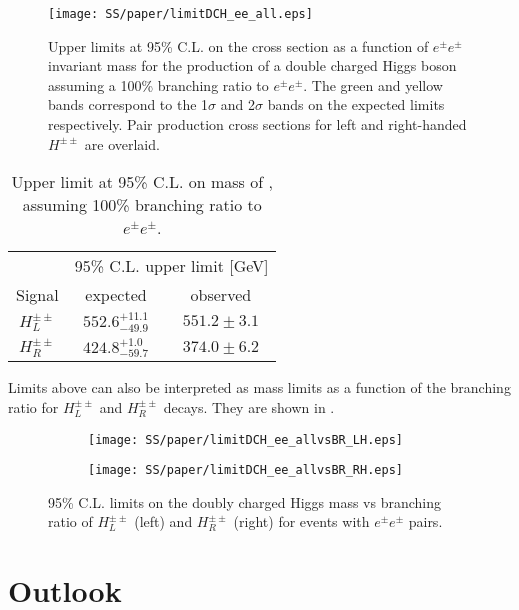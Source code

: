 \begin{figure}[h]
\begin{center}
\texttt{[image: SS/paper/limitDCH\_ee\_all.eps]}
\caption{Upper limits at 95\% C.L. on the cross section as a function of $e^{\pm}e^{\pm}$ invariant mass for the production of a double charged Higgs boson 
assuming a 100\% branching ratio to $e^{\pm}e^{\pm}$. The green and yellow bands correspond to the 1$\sigma$ and 2$\sigma$ bands on the expected limits respectively.
Pair production cross sections for left and right-handed $H^{\pm\pm}$ are overlaid.}
\label{fig:dch_limits_mass}
\end{center}
\end{figure}

\begin{table}[htbp]
\begin{center}
\begin{tabular}{c||c|c}
& \multicolumn{2}{c}{95\%  C.L. upper limit [GeV]}\\
Signal & expected & observed \\
\hline
$H^{\pm\pm}_L$ & $552.6^{+11.1}_{-49.9}$ & $551.2 \pm 3.1$ \\
\hline
$H^{\pm\pm}_R$ & $424.8^{+1.0}_{-59.7}$ & $374.0 \pm 6.2$ \\
\end{tabular}
\end{center}
\caption{Upper limit at 95\% C.L. on mass of \dch, assuming 100\% branching ratio to $e^{\pm}e^{\pm}$.}
\label{tab:limits_mass}
\end{table}

Limits above can also be interpreted as mass limits as a function of the branching ratio for $H^{\pm\pm}_L$ and $H^{\pm\pm}_R$ decays.
They are shown in .

\begin{figure}
\begin{subfigure}{.5\textwidth}
  \centering
  \texttt{[image: SS/paper/limitDCH\_ee\_allvsBR\_LH.eps]}
\end{subfigure}%
\begin{subfigure}{.5\textwidth}
  \centering
  \texttt{[image: SS/paper/limitDCH\_ee\_allvsBR\_RH.eps]}
\end{subfigure}
\caption{95\% C.L. limits on the doubly charged Higgs mass vs 
branching ratio of $H^{\pm\pm}_L$ (left) and $H^{\pm\pm}_R$ (right) for events with $e^{\pm}e^{\pm}$ pairs.}
  \label{fig:dch_limits_BR}
\end{figure}

\section{Outlook}
\label{sec:ssOutlook}
